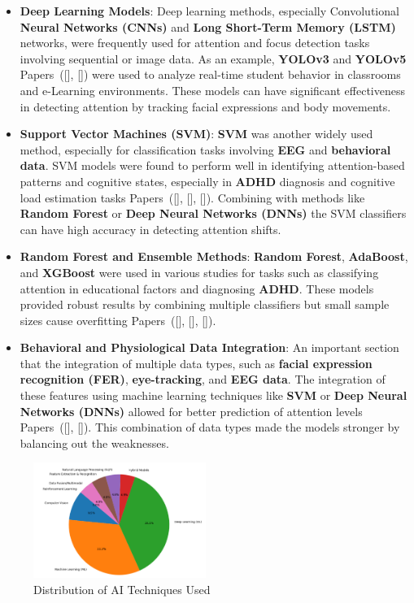 \documentclass[twocolumn,12pt]{article}
\begin{document}
{\begin{itemize}
    \item \textbf{Deep Learning Models}: Deep learning methods, especially Convolutional \textbf{Neural Networks (CNNs)} and \textbf{Long Short-Term Memory (LSTM)} networks, were frequently used for attention and focus detection tasks involving sequential or image data. As an example, \textbf{YOLOv3} and \textbf{YOLOv5} Papers~([\citealp{ref1}], [\citealp{ref8}]) were used to analyze real-time student behavior in classrooms and e-Learning environments. These models can have significant effectiveness in detecting attention by tracking facial expressions and body movements.
    \item \textbf{Support Vector Machines (SVM)}: \textbf{SVM} was another widely used method, especially for classification tasks involving \textbf{EEG} and \textbf{behavioral data}. SVM models were found to perform well in identifying attention-based patterns and cognitive states, especially in \textbf{ADHD} diagnosis and cognitive load estimation tasks Papers~([\citealp{ref11}], [\citealp{ref12}], [\citealp{ref19}]). Combining with methods like \textbf{Random Forest} or \textbf{Deep Neural Networks (DNNs)} the SVM classifiers can have high accuracy in detecting attention shifts.
    \item \textbf{Random Forest and Ensemble Methods}: \textbf{Random Forest}, \textbf{AdaBoost}, and \textbf{XGBoost} were used in various studies for tasks such as classifying attention in educational factors and diagnosing \textbf{ADHD}. These models provided robust results by combining multiple classifiers but small sample sizes cause overfitting Papers~([\citealp{ref2}], [\citealp{ref13}], [\citealp{ref15}]).
    \item \textbf{Behavioral and Physiological Data Integration}: An important section that the integration of multiple data types, such as \textbf{facial expression recognition (FER)}, \textbf{eye-tracking}, and \textbf{EEG data}. The integration of these features using machine learning techniques like \textbf{SVM} or \textbf{Deep Neural Networks (DNNs)} allowed for better prediction of attention levels Papers~([\citealp{ref7}], [\citealp{ref16}]). This combination of data types made the models stronger by balancing out the weaknesses.
\end{itemize}

\begin{figure}[H]
\centering
\includegraphics[width=0.5\textwidth]{piechart.png}
\caption{Distribution of AI Techniques Used}
\label{fig:piechart}
\end{figure}

}
\end{document}
